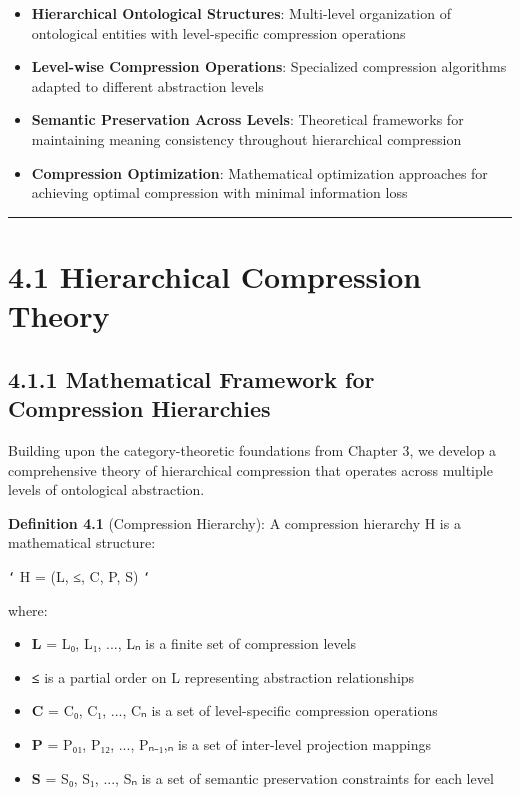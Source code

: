\begin{itemize}
\item \textbf{Hierarchical Ontological Structures}: Multi-level organization of ontological entities with level-specific compression operations
\item \textbf{Level-wise Compression Operations}: Specialized compression algorithms adapted to different abstraction levels
\item \textbf{Semantic Preservation Across Levels}: Theoretical frameworks for maintaining meaning consistency throughout hierarchical compression
\item \textbf{Compression Optimization}: Mathematical optimization approaches for achieving optimal compression with minimal information loss
\end{itemize}

\hrule

\section{4.1 Hierarchical Compression Theory}

\subsection{4.1.1 Mathematical Framework for Compression Hierarchies}

Building upon the category-theoretic foundations from Chapter 3, we develop a comprehensive theory of hierarchical compression that operates across multiple levels of ontological abstraction.

\textbf{Definition 4.1} (Compression Hierarchy): A compression hierarchy H is a mathematical structure:

\texttt{`}
H = (L, ≤, C, P, S)
\texttt{`}

where:
\begin{itemize}
\item \textbf{L} = {L₀, L₁, ..., Lₙ} is a finite set of compression levels
\item \textbf{≤} is a partial order on L representing abstraction relationships
\item \textbf{C} = {C₀, C₁, ..., Cₙ} is a set of level-specific compression operations
\item \textbf{P} = {P₀₁, P₁₂, ..., Pₙ₋₁,ₙ} is a set of inter-level projection mappings
\item \textbf{S} = {S₀, S₁, ..., Sₙ} is a set of semantic preservation constraints for each level
\end{itemize}

